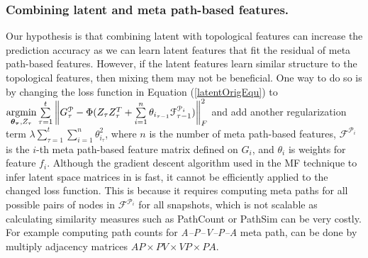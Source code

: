 





\subsubsection{Combining latent and meta path-based features.}
Our hypothesis is that combining latent with topological features can increase the prediction accuracy as we can learn latent features that fit the residual of meta path-based features. However, if the latent features learn similar structure to the topological features, then mixing them may not be beneficial. One way to do so is by changing the loss function in Equation (\ref{latentOrigEqu}) to $\operatorname*{argmin}\limits_{\boldsymbol{\theta_\tau},Z_\tau}\sum\limits_{\tau=1}^{t}\left \| G^\mathcal{P}_\tau - \Phi(Z_{\tau}Z_{\tau}^T + \sum\limits_{i=1}^{n}\theta_{i_{\tau-1}} \mathcal{F}^{\mathcal{P}_i}_{\tau-1}) \right \|^2_F$ and add another regularization term $\lambda \sum\limits_{\tau=1}^{t} \sum\limits_{i=1}^{n} \theta_{i_\tau}^2$, where $n$ is the number of meta path-based features, $\mathcal{F}^{\mathcal{P}_i}$ is the $i$-th meta path-based feature matrix defined on $G_i$, and $\theta_i$ is weights for feature $f_i$. Although the gradient descent algorithm used in the MF technique to infer latent space matrices in \cite{Zhu2016} is fast, it cannot be efficiently applied to the changed loss function. This is because it requires computing meta paths for all possible pairs of nodes in $\mathcal{F}^{\mathcal{P}_i}$ for all snapshots, which is not scalable as calculating similarity measures such as PathCount or PathSim can be very costly. For example computing path counts for \textit{A--P--V--P--A} meta path, can be done by multiply adjacency matrices $AP\times PV\times VP\times PA$. 


